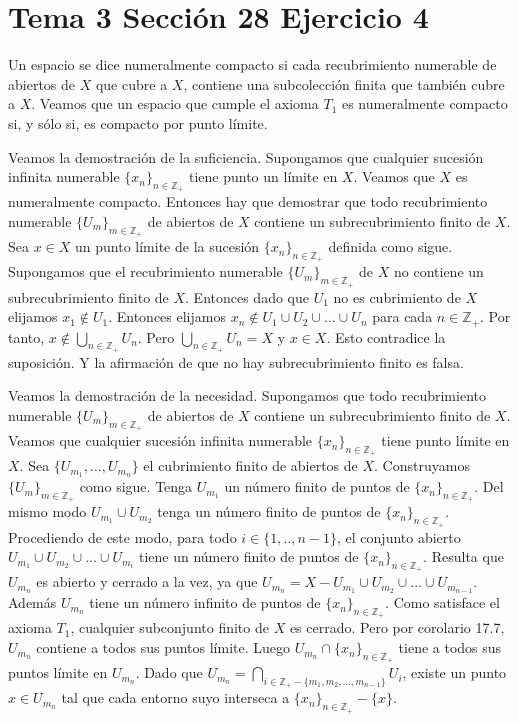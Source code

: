 \documentclass{article}
\begin{document}
\section{Tema 3 Sección 28 Ejercicio 4}
Un espacio se dice numeralmente compacto si cada recubrimiento numerable de abiertos de $X$ que cubre a $X$, contiene una subcolección finita que también cubre a $X$. Veamos que un espacio que cumple el axioma $T_1$ es numeralmente compacto si, y sólo si, es compacto por punto límite.

Veamos la demostración de la suficiencia. Supongamos que cualquier sucesión infinita numerable $\{x_n\}_{n\in\mathbb{Z}_+}$ tiene punto un límite en $X$. Veamos que $X$ es numeralmente compacto.  Entonces hay que demostrar que todo recubrimiento numerable $\{U_m\}_{m\in\mathbb{Z}_+}$ de abiertos de $X$ contiene un subrecubrimiento finito de $X$. Sea $x\in X$ un punto límite de la sucesión $\{x_n\}_{n\in\mathbb{Z}_+}$ definida como sigue. Supongamos que el recubrimiento numerable $\{U_m\}_{m\in\mathbb{Z}_+}$ de $X$ no contiene un subrecubrimiento finito de $X$. Entonces dado que $U_1$ no es cubrimiento de $X$ elijamos $x_1\notin U_1$. Entonces elijamos $x_n\notin U_1\cup U_2\cup ... \cup U_n$ para cada $n\in \mathbb{Z}_+$. Por tanto, $x\notin \bigcup_{n\in \mathbb{Z}_+}U_n$. Pero $\bigcup_{n\in \mathbb{Z}_+}U_n=X$ y $x\in X$. Esto contradice la suposición. Y la afirmación de que no hay subrecubrimiento finito es falsa.

Veamos la demostración de la necesidad. Supongamos que todo recubrimiento numerable $\{U_m\}_{m\in\mathbb{Z}_+}$ de abiertos de $X$ contiene un subrecubrimiento finito de $X$. Veamos que cualquier sucesión infinita numerable $\{x_n\}_{n\in\mathbb{Z}_+}$ tiene punto
 límite en $X$. Sea $\{U_{m_1},...,U_{m_n}\}$ el cubrimiento finito de abiertos de $X$. Construyamos $\{U_m\}_{m\in\mathbb{Z}_+}$ como sigue. Tenga $U_{m_1}$ un número finito de puntos de $\{x_n\}_{n\in\mathbb{Z}_+}$. Del mismo modo $U_{m_1}\cup U_{m_2}$ tenga un número finito de puntos de $\{x_n\}_{n\in\mathbb{Z}_+}$. Procediendo de este modo, para todo $i\in \{1,..,n-1\}$, el conjunto abierto $U_{m_1}\cup U_{m_2}\cup...\cup U_{m_{i}}$ tiene un número finito de puntos de $\{x_n\}_{n\in\mathbb{Z}_+}$. Resulta que $U_{m_n}$ es abierto y cerrado a la vez, ya que $U_{m_n}=X-U_{m_1}\cup U_{m_2}\cup...\cup U_{m_{n-1}}$. Además $U_{m_n}$ tiene un número infinito de puntos de $\{x_n\}_{n\in\mathbb{Z}_+}$. Como satisface el axioma $T_1$, cualquier subconjunto finito de $X$ es cerrado. Pero por corolario 17.7, $U_{m_n}$ contiene a todos sus puntos límite. Luego $U_{m_n}\cap \{x_n\}_{n\in\mathbb{Z}_+}$ tiene a todos sus puntos límite en $U_{m_n}$. Dado que $U_{m_n}=\bigcap_{i\in\mathbb{Z}_+-\{m_1,m_2,...,m_{n-1}\}}U_i$, existe un punto $x\in U_{m_n}$ tal que cada entorno suyo interseca a $\{x_n\}_{n\in\mathbb{Z}_+}-\{x\}$.
\end{document}
